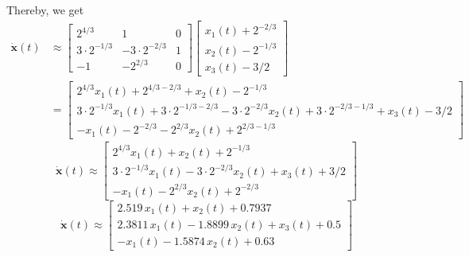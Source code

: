Thereby, we get
\begin{align*}
    \mathbf{\dot x}(t)
     & \approx
    \begin{bmatrix}
        2^{4/3}         & 1                & 0 \\
        3\cdot 2^{-1/3} & -3\cdot 2^{-2/3} & 1 \\
        -1              & -2^{2/3}         & 0
    \end{bmatrix}
    \begin{bmatrix}
        x_1(t) + 2^{-2/3} \\
        x_2(t) - 2^{-1/3} \\
        x_3(t) - 3/2
    \end{bmatrix} \\
     & =
    \begin{bmatrix}
        2^{4/3}x_1(t) + 2^{4/3-2/3} + x_2(t) - 2^{-1/3}                                                          \\
        3\cdot 2^{-1/3}x_1(t) + 3\cdot 2^{-1/3-2/3} - 3\cdot 2^{-2/3}x_2(t) + 3\cdot 2^{-2/3-1/3} + x_3(t) - 3/2 \\
        -x_1(t) - 2^{-2/3} - 2^{2/3}x_2(t) + 2^{2/3-1/3}
    \end{bmatrix}
\end{align*}
\[
    \boxed{
        \mathbf{\dot x}(t) \approx
        \begin{bmatrix}
            2^{4/3} x_1(t) + x_2(t) + 2^{-1/3}                             \\
            3\cdot 2^{-1/3} x_1(t) - 3\cdot 2^{-2/3} x_2(t) + x_3(t) + 3/2 \\
            - x_1(t) - 2^{2/3} x_2(t) + 2^{-2/3}
        \end{bmatrix}
    }
\]
\[
    \mathbf{\dot x}(t) \approx
    \begin{bmatrix}
        2.519\, x_1(t) + x_2(t) + 0.7937                 \\
        2.3811\, x_1(t) - 1.8899\, x_2(t) + x_3(t) + 0.5 \\
        - x_1(t) - 1.5874\, x_2(t) + 0.63
    \end{bmatrix}
\]
